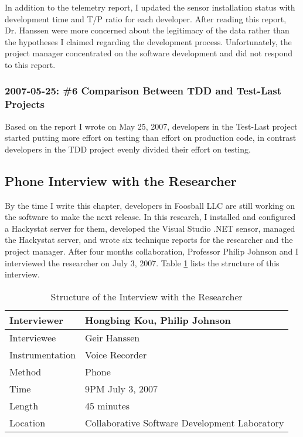 In addition to the telemetry report, I updated the sensor installation status with development time and T/P ratio for each developer. After reading this report, Dr. Hanssen were more concerned about the legitimacy of the data rather than the hypotheses I claimed regarding the development process. Unfortunately, the project manager concentrated on the software development and did not respond to this report. 

\subsubsection{2007-05-25: \#6 Comparison Between TDD and Test-Last Projects}
Based on the report I wrote on May 25, 2007, developers in the Test-Last project started putting more effort on testing than effort on production code, in contrast developers in the TDD project evenly divided their effort on testing. 

\subsection{Phone Interview with the Researcher}
By the time I write this chapter, developers in Foosball LLC are still working on the software to make the next release. In this research, I installed and configured a Hackystat server for them, developed the Visual Studio .NET sensor, managed the Hackystat server, and wrote six technique reports for the researcher and the project manager. After four months collaboration, Professor Philip Johnson and I interviewed the researcher on July 3, 2007. Table \ref{tab:InterviewStructure} lists the structure of this interview.
\begin{table}[!ht]
\centering
\caption{Structure of the Interview with the Researcher}
\begin{tabular}{|l|l|} \hline
Interviewer & Hongbing Kou, Philip Johnson  \\ \hline
Interviewee & Geir Hanssen \\ \hline
Instrumentation & Voice Recorder \\ \hline
Method      & Phone \\ \hline
Time        & 9PM July 3, 2007 \\ \hline
Length      & 45 minutes \\ \hline
Location    & Collaborative Software Development Laboratory \\ \hline
\end{tabular}
\label{tab:InterviewStructure}
\end{table}

